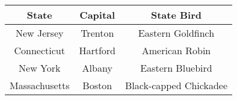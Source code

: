\begin{center}
  \begin{tabular}{c c c}
    \hline
    \hline
    State             & Capital    & State Bird             \\
    \hline
    New Jersey        & Trenton    & Eastern Goldfinch      \\
    Connecticut       & Hartford   & American Robin         \\
    New York          & Albany     & Eastern Bluebird       \\
    Massachusetts     & Boston     & Black-capped Chickadee \\
    \hline
    \hline
  \end{tabular}
\end{center}
